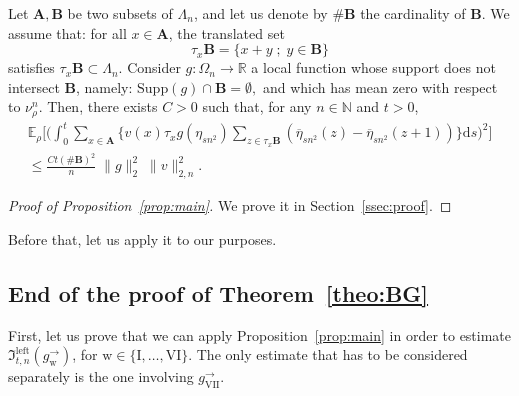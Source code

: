 \documentclass[10pt]{amsart}
\theoremstyle{definition}\newtheorem{defi}[theo]{Definition}\newtheorem{rema}[theo]{Remark}\newtheorem{exam}[theo]{Example}\newtheorem{exem}[theo]{Example}\newtheorem{nota}[theo]{Notation}
\newcommand{\bfA}{\mathbf{A}}
\newcommand{\bfB}{\mathbf{B}}
\newcommand*{\rmw}{\mathrm{w}}
\newcommand*{\rmleft}{\mathrm{left}}
\newcommand*{\rmI}{\mathrm{I}}
\newcommand*{\rmVI}{\mathrm{VI}}
\newcommand*{\rmVII}{\mathrm{VII}}
\newcommand{\bb}[1]{{\mathbb #1}}
\newcommand{\mf}[1]{{\mathfrak #1}}
\renewcommand{\bar}{\overline}
\renewcommand{\leq}{\leqslant}
\newcommand*{\dd}{\mathrm{d}}
\newcommand*{\ds}{\dd s}
\begin{document}
\begin{prop}\label{prop:main}
Let $\bfA, \bfB$ be two subsets of $\Lambda_n$, and let us denote by $\#{\bfB}$ the cardinality of $\bfB$. We assume that: for all $x\in\bfA$, the translated set
\[
\tau_x{\bfB}=\{x+y\; ; \; y \in \bfB\}
\]
satisfies $ \tau_x{\bfB}\subset \Lambda_n$. Consider $g:\Omega_n\to\bb R$ a local function whose support does not intersect $\bfB$, namely: $\mathrm{Supp}(g) \cap \mathbf{B} = \emptyset,$ and which has mean zero with respect to $\nu^n_\rho$. Then, there exists $C>0$ such that, for any $n \in \bb N$ and $t>0$,
\begin{multline}\label{eq:main-estim}
\bb E_\rho\bigg[\bigg(\int_0^t\sum_{x\in\bfA} \Big\{v(x) \tau_xg(\eta_{sn^2}) \sum_{z\in\tau_x\bfB} (\bar\eta_{sn^2}(z)-\bar\eta_{sn^2}(z+1)) \Big\} \ds \bigg)^2\bigg] \\ \leq \frac{Ct(\#{\bfB})^2}{n}\; \|g\|_2^2 \; \|v\|_{2,n}^2.
\end{multline}
\end{prop}

\begin{proof}[Proof of Proposition~\ref{prop:main}] We prove it in Section~\ref{ssec:proof}.
\end{proof}

Before that, let us apply it to our purposes.

\subsection{End of the proof of Theorem~\ref{theo:BG}} First, let us prove that we can apply Proposition~\ref{prop:main} in order to estimate $\mf I_{t,n}^{\rmleft}(g^\rightarrow_{\rmw})$, for ${\rmw} \in \{ \rmI,\dots, \rmVI\}$. The only estimate that has to be considered separately is the one involving $g^\rightarrow_{\rmVII}$.
\end{document}
